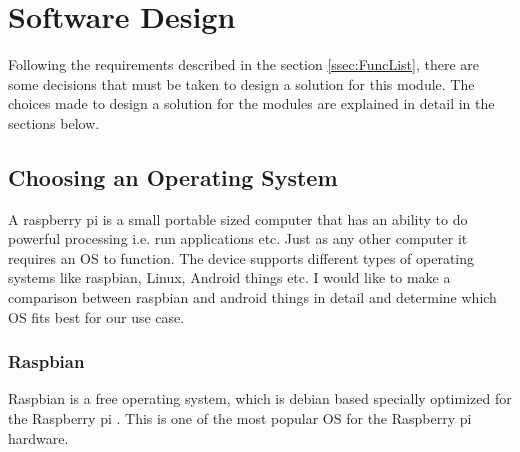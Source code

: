 \newpage
\chapter{Software Design}
    Following the requirements described in the section \ref{ssec:FuncList}, there are
    some decisions that must be taken to design a solution for this module. The choices
    made to design a solution for the modules are explained in detail in the sections below.
    
    \section{Choosing an Operating System}
        A raspberry pi is a small portable sized computer that has an ability to
        do powerful processing i.e. run applications etc. Just as any other computer
        it requires an OS to function. The device supports different
        types of operating systems like raspbian, Linux, Android things etc. I would like to 
        make a comparison between raspbian and android things in detail 
        and determine which OS fits best for our use case.

        \subsection{Raspbian}
            Raspbian is a free operating system, which is debian based specially optimized 
            for the Raspberry pi \cite{raspbien}. This is one of the most popular OS for
            the Raspberry pi hardware. 

